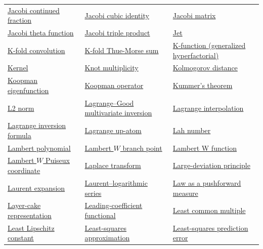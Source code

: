 \documentclass[11pt,oneside]{article}
\begin{document}
\begin{longtable}{L{0.31\textwidth}L{0.31\textwidth}L{0.31\textwidth}}
\hyperlink{gls:j-fraction}{Jacobi continued fraction} & \hyperlink{gls:jacobi-cubic-identity}{Jacobi cubic identity} & \hyperlink{gls:jacobi-matrix}{Jacobi matrix} \\
\hyperlink{gls:jacobi-theta-function}{Jacobi theta function} & \hyperlink{gls:jacobi-triple-product}{Jacobi triple product} & \hyperlink{gls:jet}{Jet} \\
\hyperlink{gls:k-fold-convolution}{K-fold convolution} & \hyperlink{gls:k-fold-thue-morse-sum}{K-fold Thue-Morse sum} & \hyperlink{gls:k-function}{K-function (generalized hyperfactorial)} \\
\hyperlink{gls:kernel}{Kernel} & \hyperlink{gls:knot-multiplicity}{Knot multiplicity} & \hyperlink{gls:kolmogorov-distance}{Kolmogorov distance} \\
\hyperlink{gls:koopman-eigenfunction}{Koopman eigenfunction} & \hyperlink{gls:koopman-operator}{Koopman operator} & \hyperlink{gls:kummer-theorem}{Kummer's theorem} \\
\hyperlink{gls:l2-norm}{L2 norm} & \hyperlink{gls:lagrange-good-inversion}{Lagrange--Good multivariate inversion} & \hyperlink{gls:lagrange-interpolation}{Lagrange interpolation} \\
\hyperlink{gls:lagrange-inversion-formula}{Lagrange inversion formula} & \hyperlink{gls:lagrange-up-atom}{Lagrange up-atom} & \hyperlink{gls:lah-number}{Lah number} \\
\hyperlink{gls:lambert-polynomial}{Lambert polynomial} & \hyperlink{gls:lambert-w-branch-point}{Lambert \(W\) branch point} & \hyperlink{gls:lambert-w-function}{Lambert W function} \\
\hyperlink{gls:lambert-w-puiseux-coordinate}{Lambert \(W\) Puiseux coordinate} & \hyperlink{gls:laplace-transform}{Laplace transform} & \hyperlink{gls:large-deviation-principle}{Large-deviation principle} \\
\hyperlink{gls:laurent-expansion}{Laurent expansion} & \hyperlink{gls:laurent-log-series}{Laurent--logarithmic series} & \hyperlink{gls:law-pushforward-identity}{Law as a pushforward measure} \\
\hyperlink{gls:layer-cake-representation}{Layer-cake representation} & \hyperlink{gls:leading-coefficient-functional}{Leading-coefficient functional} & \hyperlink{gls:least-common-multiple}{Least common multiple} \\
\hyperlink{gls:least-lipschitz-constant}{Least Lipschitz constant} & \hyperlink{gls:least-squares-approximation}{Least-squares approximation} & \hyperlink{gls:least-squares-prediction-error}{Least-squares prediction error} \\

\end{longtable}
\end{document}
